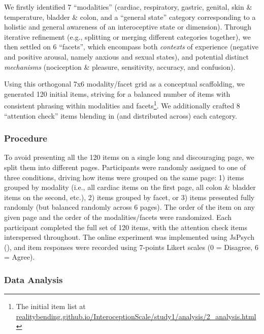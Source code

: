 \documentclass[
  jou,
  floatsintext,
  longtable,
  nolmodern,
  notxfonts,
  notimes,
  colorlinks=true,linkcolor=blue,citecolor=blue,urlcolor=blue]{apa7}
\begin{document}
We firstly identified 7 ``modalities'' (cardiac, respiratory, gastric,
genital, skin \& temperature, bladder \& colon, and a ``general state''
category corresponding to a holistic and general awareness of an
interoceptive state or dimension). Through iterative refinement (e.g.,
splitting or merging different categories together), we then settled on
6 ``facets'', which encompass both \emph{contexts} of experience
(negative and positive arousal, namely anxious and sexual states), and
potential distinct \emph{mechanisms} (nociception \& pleasure,
sensitivity, accuracy, and confusion).

Using this orthogonal 7x6 modality/facet grid as a conceptual
scaffolding, we generated 120 initial items, striving for a balanced
number of items with consistent phrasing within modalities and
facets\footnote{The initial item list at
  \href{https://realitybending.github.io/InteroceptionScale/study1/analysis/2_analysis.html}{realitybending.github.io/InteroceptionScale/study1/analysis/2\_analysis.html}}.
We additionally crafted 8 ``attention check'' items blending in (and
distributed across) each category.

\subsubsection{Procedure}\label{procedure}

To avoid presenting all the 120 items on a single long and discouraging
page, we split them into different pages. Participants were randomly
assigned to one of three conditions, driving how items were grouped on
the same page: 1) items grouped by modality (i.e., all cardiac items on
the first page, all colon \& bladder items on the second, etc.), 2)
items grouped by facet, or 3) items presented fully randomly (but
balanced randomly across 6 pages). The order of the item on any given
page and the order of the modalities/facets were randomized. Each
participant completed the full set of 120 items, with the attention
check items interspersed throughout. The online experiment was
implemented using JsPsych (), and item responses were recorded using 7-points Likert scales (0
= Disagree, 6 = Agree).

\subsubsection{Data Analysis}\label{data-analysis}
\end{document}
